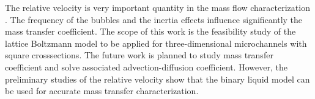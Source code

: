 \documentclass{article}
\begin{document}
The relative velocity is very important quantity in the mass flow characterization
\cite{kreutzer-taylor,yue-mass}. The frequency of the bubbles \cite{kreutzer-taylor} and the
inertia effects \citet{heil-bretherton} influence significantly the mass transfer coefficient. The
scope of this work is the feasibility study of the lattice Boltzmann model to be applied for
three-dimensional microchannels with square crosssections. The future work is planned to study mass
transfer coefficient and solve associated advection-diffusion coefficient. However, the preliminary
studies of the relative velocity show that the binary liquid model can be used for accurate mass
transfer characterization.

\end{document}
